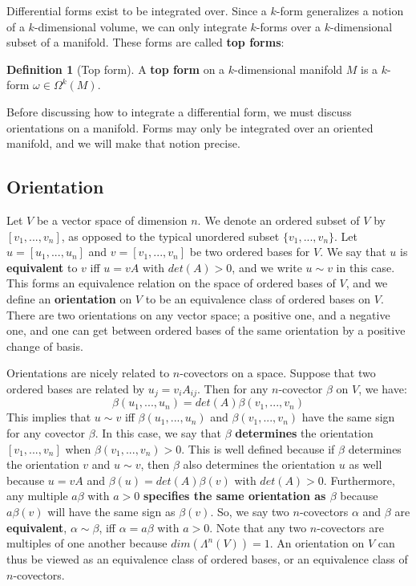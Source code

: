 \documentclass[11pt, oneside]{article}   	%
\theoremstyle{definition}
\newtheorem{definition}{Definition}[section]
\begin{document}
Differential forms exist to be integrated over. Since a $k$-form generalizes a notion of a $k$-dimensional volume, we 
can only integrate $k$-forms over a $k$-dimensional subset of a manifold. These forms are called \textbf{top forms}:
\begin{definition}[Top form]
	A \textbf{top form} on a $k$-dimensional manifold $M$ is a $k$-form $\omega\in\Omega^k(M)$. 
\end{definition}
Before discussing how to integrate a differential form, we must discuss orientations on a manifold. Forms may only be 
integrated over an oriented manifold, and we will make that notion precise.

\subsection{Orientation}

Let $V$ be a vector space of dimension $n$. We denote an ordered subset of $V$ by $[v_1, ..., v_n]$, as opposed to the 
typical unordered subset $\{v_1, ..., v_n\}$. Let $u = [u_1, ..., u_n]$ and $v = [v_1, ..., v_n]$ be two ordered bases for $V$. 
We say that $u$ is \textbf{equivalent} to $v$ iff $u = vA$ with $det(A) > 0$, and we write $u\sim v$ in this case. This forms an 
equivalence relation on the space of ordered bases of $V$, and we define an \textbf{orientation} on $V$ to be an equivalence 
class of ordered bases on $V$. There are two orientations on any vector space; a positive one, and a negative one, and one 
can get between ordered bases of the same orientation by a positive change of basis. 

Orientations are nicely related to $n$-covectors on a space. Suppose that two ordered bases are related by $u_j = v_i A_{ij}$. 
Then for any $n$-covector $\beta$ on $V$, we have:
\begin{equation}
	\beta(u_1, ..., u_n) = det(A)\beta(v_1, ..., v_n)
\end{equation}
This implies that $u\sim v$ iff $\beta(u_1, ..., u_n)$ and $\beta(v_1, ..., v_n)$ have the same sign for any covector 
$\beta$. In this case, we say that $\beta$ \textbf{determines} the orientation $[v_1, ..., v_n]$ when $\beta(v_1, ..., v_n) > 0$. 
This is well defined because if $\beta$ determines the orientation $v$ and $u\sim v$, then $\beta$ also determines the 
orientation $u$ as well because $u = vA$ and $\beta(u) = det(A)\beta(v)$ with $det(A) > 0$. Furthermore, any 
multiple $a\beta$ with $a > 0$ \textbf{specifies the same orientation as $\beta$} because $a\beta(v)$ will have the 
same sign as $\beta(v)$. So, we say two $n$-covectors $\alpha$ and $\beta$ are \textbf{equivalent}, $\alpha\sim\beta$, 
iff $\alpha = a\beta$ with $a > 0$. Note that any two $n$-covectors are multiples of one another because $dim(\Lambda^n(V)) 
= 1$. An orientation on $V$ can thus be viewed as an equivalence class of ordered bases, or an equivalence class of 
$n$-covectors. 
\end{document}
